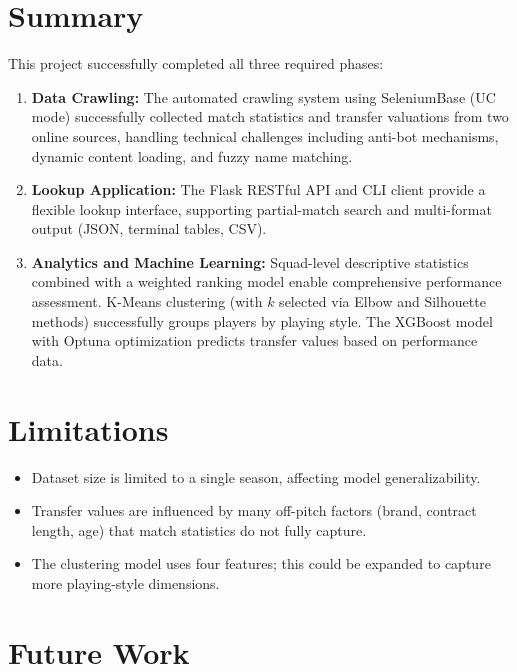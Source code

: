 \documentclass[a4paper,12pt]{report}
\begin{document}
\section{Summary}

This project successfully completed all three required phases:

\begin{enumerate}
    \item \textbf{Data Crawling:} The automated crawling system using SeleniumBase (UC mode) successfully collected match statistics and transfer valuations from two online sources, handling technical challenges including anti-bot mechanisms, dynamic content loading, and fuzzy name matching.
    
    \item \textbf{Lookup Application:} The Flask RESTful API and CLI client provide a flexible lookup interface, supporting partial-match search and multi-format output (JSON, terminal tables, CSV).
    
    \item \textbf{Analytics and Machine Learning:} Squad-level descriptive statistics combined with a weighted ranking model enable comprehensive performance assessment. K-Means clustering (with $k$ selected via Elbow and Silhouette methods) successfully groups players by playing style. The XGBoost model with Optuna optimization predicts transfer values based on performance data.
\end{enumerate}

\section{Limitations}

\begin{itemize}
    \item Dataset size is limited to a single season, affecting model generalizability.
    \item Transfer values are influenced by many off-pitch factors (brand, contract length, age) that match statistics do not fully capture.
    \item The clustering model uses four features; this could be expanded to capture more playing-style dimensions.
\end{itemize}

\section{Future Work}
\end{document}
